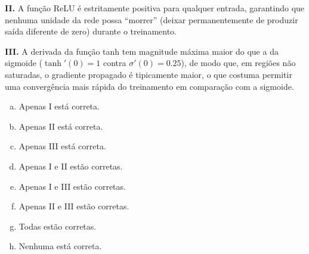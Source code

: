 \documentclass[11pt,a4paper]{article}
\begin{document}
\begin{enumerate}[1)]
\textbf{II.} A função ReLU é estritamente positiva para qualquer entrada, garantindo que nenhuma unidade da rede possa ``morrer'' (deixar permanentemente de produzir saída diferente de zero) durante o treinamento.

\textbf{III.} A derivada da função tanh tem magnitude máxima maior do que a da sigmoide ($\tanh'(0) = 1$ contra $\sigma'(0) = 0.25$), de modo que, em regiões não saturadas, o gradiente propagado é tipicamente maior, o que costuma permitir uma convergência mais rápida do treinamento em comparação com a sigmoide.

\begin{enumerate}[a)]
    \item Apenas I está correta.
    \item Apenas II está correta.
    \item Apenas III está correta.
    \item Apenas I e II estão corretas.
    \item Apenas I e III estão corretas.
    \item Apenas II e III estão corretas.
    \item Todas estão corretas.
    \item Nenhuma está correta.
\end{enumerate}


\end{enumerate}
\end{document}
